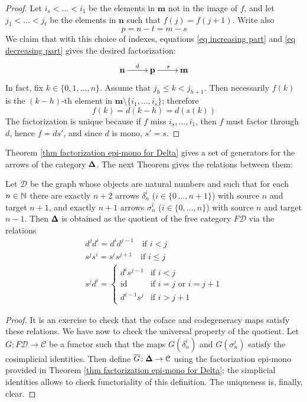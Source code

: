 \begin{refsection}
\begin{proof}
Let $i_s < \ldots < i_1$ be the elements in $\mathbf m$ not in the image of $f$, and let $j_1 < \ldots < j_t$ be the elements in $\mathbf n$ such that $f(j) = f(j+1)$. Write also
\[
p = n -t = m - s
\]
We claim that with this choice of indexes, equations \eqref{eq increasing part} and \eqref{eq decreasing part} gives the desired factorization:
\[
\xymatrix{ \mathbf n \ar[r]^d & \mathbf p \ar[r]^s & \mathbf m }
\]
In fact, fix $k \in \{0,1,\ldots,n\}$. Assume that $j_h \le k < j_{h+1}$. Then necessarily $f(k)$ is the $(k-h)$-th element in $\mathbf m \setminus \{i_1,\ldots,i_s\}$; therefore
\[
f(k) = d(k-h) = d(s(k))
\]
The factorization is unique because if $f$ miss $i_s,\ldots,i_1$, then $f$ must factor through $d$, hence $f = d s'$, and since $d$ is mono, $s' = s$.
\end{proof}

Theorem \ref{thm factorization epi-mono for Delta} gives a set of generators for the arrows of the category $\pmb{\Delta}$. The next Theorem gives the relations between them:

\begin{thm} \label{thm presentation for Delta}
Let $\mathcal D$ be the graph whose objects are natural numbers and such that for each $n \in \mathbb{N}$ there are exactly $n+2$ arrows $\delta^i_n$ ($i \in \{0\,\ldots,n+1\}$) with source $n$ and target $n+1$, and exactly $n+1$ arrows $\sigma^i_n$ ($i \in \{0,\ldots,n\}$) with source $n$ and target $n-1$. Then $\pmb{\Delta}$ is obtained as the quotient of the free category $F \mathcal D$ via the relations
\begin{equation} \label{eq cosimplicial identities}
\begin{gathered}
d^j d^i = d^i d^{j-1} \quad \text{if } i < j \\
s^j s^i = s^i s^{j+1} \quad \text{if } i \le j \\
s^j d^i = \begin{cases} d^i s^{j-1} & \text{if } i < j \\
\text{id} & \text{if } i = j \text{ or } i = j + 1 \\
d^{i-1} s^j & \text{if } i > j+1 \end{cases}
\end{gathered}
\end{equation}
\end{thm}

\begin{proof}
It is an exercise to check that the coface and codegeneracy maps satisfy these relations. We have now to check the universal property of the quotient. Let $G \colon F \mathcal D \to \mathcal C$ be a functor such that the maps $G(\delta^i_n)$ and $G(\sigma^i_n)$ satisfy the cosimplicial identities. Then define $\overline{G} \colon \pmb{\Delta} \to \mathcal C$ using the factorization epi-mono provided in Theorem \ref{thm factorization epi-mono for Delta}; the simplicial identities allows to check functoriality of this definition. The uniqueness is, finally, clear.
\end{proof}


\end{refsection}
